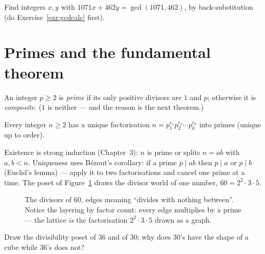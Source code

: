 \begin{exercise}[medium]\label{exr:bezout}
Find integers $x, y$ with $1071x + 462y = \gcd(1071, 462)$, by
back-substitution (do Exercise~\ref{exr:gcdcalc} first).
\end{exercise}

\section{Primes and the fundamental theorem}\label{sec:fta}

\begin{definition}
An integer $p \ge 2$ is \emph{prime} if its only positive divisors are $1$
and $p$; otherwise it is \emph{composite}. ($1$ is neither --- and the
reason is the next theorem.)
\end{definition}

\begin{theorem}
Every integer $n \ge 2$ has a unique factorisation
$n = p_1^{e_1} p_2^{e_2} \cdots p_k^{e_k}$ into primes (unique up to order).
\end{theorem}

Existence is strong induction (Chapter~3): $n$ is prime or splits
$n = ab$ with $a, b < n$. Uniqueness uses B\'ezout's corollary: if a prime
$p \mid ab$ then $p \mid a$ or $p \mid b$ (Euclid's lemma) --- apply it to
two factorisations and cancel one prime at a time. The poset of
Figure~\ref{fig:poset} draws the divisor world of one number, $60 =
2^2\cdot3\cdot5$.

\begin{figure}[ht]\centering

\caption{The divisors of $60$, edges meaning ``divides with nothing
between''. Notice the layering by factor count: every edge multiplies by a
prime --- the lattice \emph{is} the factorisation $2^2\cdot3\cdot5$ drawn as
a graph.}
\label{fig:poset}
\end{figure}

\begin{exercise}[easy]\label{exr:poset}
Draw the divisibility poset of $36$ and of $30$; why does $30$'s have the
shape of a cube while $36$'s does not?
\end{exercise}

